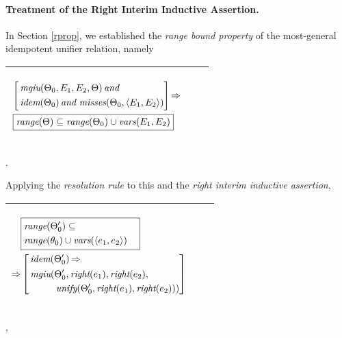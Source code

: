 \documentclass[runningheads]{llncs}
\DeclareMathOperator{\uand}{\emph{and}\,}
\DeclareMathOperator{\uimplies}{\Rightarrow}
\DeclareMathOperator{\unify}{\emph{unify}}
\DeclareMathOperator{\rig}{\emph{right}}
\DeclareMathOperator{\idem}{\emph{idem}}
\DeclareMathOperator{\mgiu}{\emph{mgiu}}
\begin{document}
\paragraph{Treatment of the Right Interim Inductive Assertion.} 
In Section \ref{rprop}, we established the \emph{range bound property} of the most-general idempotent unifier relation, namely
  \begin{center}
  \begin{tabular}{|m{}|m{}||m{}|}
\hline
\begin{center}
{\begin{align*} 
 &
 \left[
\begin{aligned} 
 &\mgiu(\Thet{0}, \E{1}, \E{2}, \Theta)  \uand \\
 &\idem(\Thet{0}) \uand \misses(\Thet{0},\langle \E{1}, \E{2}\rangle)
\end{aligned}
\right]
 \uimplies \\
 &\,\boxed{\range(\Theta) \subseteq \range(\Thet{0}) \cup \vars(\E{1}, \E{2})} \end{align*} }  
\end{center}& &  \\  \hline
\end{tabular}.
\end{center}
Applying the \emph{resolution rule} to this and the \emph{right interim inductive assertion},
  \begin{center}
  \begin{tabular}{|m{}|m{}||m{}|}
\hline
\begin{center}
{$\begin{aligned}
 &\begin{aligned}
&\begin{aligned}
&\boxed{\begin{aligned}
 &\begin{aligned}
 &\range(\Thet{0}') \subseteq \\
  &\range(\thet{0})\cup\vars(\langle \e{1}, \e{2} \rangle) 
  \end{aligned}
  \end{aligned}} 
  \end{aligned} 
\end{aligned} \\
 \uimplies &\left[\begin{aligned}&\idem(\Thet{0}') \uimplies \\
 &\begin{aligned}
    {\,\mgiu}(&\Thet{0}', \rig(\e{1}), \rig(\e{2}), \\
    &\unify(\Thet{0}', \rig(\e{1}), \rig(\e{2}))) 
\end{aligned}
\end{aligned}\right] \end{aligned}  $}  \hspace{1cm} 
\end{center}& &  \\  \hline
\end{tabular},
\end{center}
\end{document}
